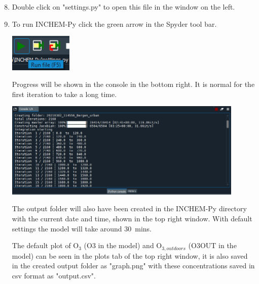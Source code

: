 \documentclass[a4paper]{refart}
\begin{document}
\newpage
{\hspace*{-\leftmarginwidth}
\begin{minipage}{\fullwidth}
\linespread{2.0}\selectfont
\begin{enumerate}
\setcounter{enumi}{7}
    \item Double click on "settings.py" to open this file in the window on the left.
    \item To run INCHEM-Py click the green arrow in the Spyder tool bar.
                
            \vspace{1em}
            \begin{minipage}[t]{\linewidth}
                \centering
                \includegraphics[width = 3cm]{run.png}
            \end{minipage}
          
          Progress will be shown in the console in the bottom right. It is normal for the first iteration to take a long time.
          
            \vspace{1em}
            \begin{minipage}[t]{\linewidth}
                \centering
                \includegraphics[width = 0.9\textwidth]{progress.png}
            \end{minipage}
            
          The output folder will also have been created in the INCHEM-Py directory with the current date and time, shown in the top right window. With default settings the model will take around 30~mins.
          
          The default plot of O$_3$ (O3 in the model) and O$_{3,outdoors}$ (O3OUT in the model) can be seen in the plots tab of the top right window, it is also saved in the created output folder as "graph.png" with these concentrations saved in csv format as "output.csv".
                    

\end{enumerate}
\end{minipage}}
\end{document}
